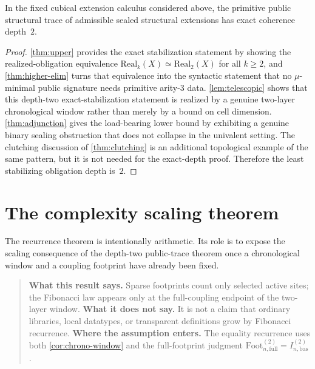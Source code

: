 \documentclass{lmcs}
\newcommand{\Real}{\mathrm{Real}}
\newcommand{\Foot}{\mathrm{Foot}}
\begin{document}
\begin{cor}
\label{cor:d2}
\label{thm:cubical-depth-exactly-two}
In the fixed cubical extension calculus considered above, the primitive public structural trace of admissible sealed structural extensions has exact coherence depth~$2$.
\end{cor}

\begin{proof}
\autoref{thm:upper} provides the exact stabilization statement by showing the realized-obligation equivalence $\Real_k(X) \simeq \Real_2(X)$ for all $k \geq 2$, and \autoref{thm:higher-elim} turns that equivalence into the syntactic statement that no $\mu$-minimal public signature needs primitive arity-$3$ data. \autoref{lem:telescopic} shows that this depth-two exact-stabilization statement is realized by a genuine two-layer chronological window rather than merely by a bound on cell dimension. \autoref{thm:adjunction} gives the load-bearing lower bound by exhibiting a genuine binary sealing obstruction that does not collapse in the univalent setting. The clutching discussion of \autoref{thm:clutching} is an additional topological example of the same pattern, but it is not needed for the exact-depth proof. Therefore the least stabilizing obligation depth is~$2$.
\end{proof}

\section{The complexity scaling theorem}
\label{sec:scaling}

The recurrence theorem is intentionally arithmetic. Its role is to expose the
scaling consequence of the depth-two public-trace theorem once a chronological
window and a coupling footprint have already been fixed.

\begin{quote}
\small
\textbf{What this result says.}
Sparse footprints count only selected active sites; the Fibonacci law appears
only at the full-coupling endpoint of the two-layer window.
\textbf{What it does not say.}
It is not a claim that ordinary libraries, local datatypes, or transparent
definitions grow by Fibonacci recurrence.
\textbf{Where the assumption enters.}
The equality recurrence uses both \autoref{cor:chrono-window} and the
full-footprint judgment $\Foot_{n,\mathrm{full}}^{(2)}=I_{n,\mathrm{bas}}^{(2)}$.
\end{quote}
\end{document}
